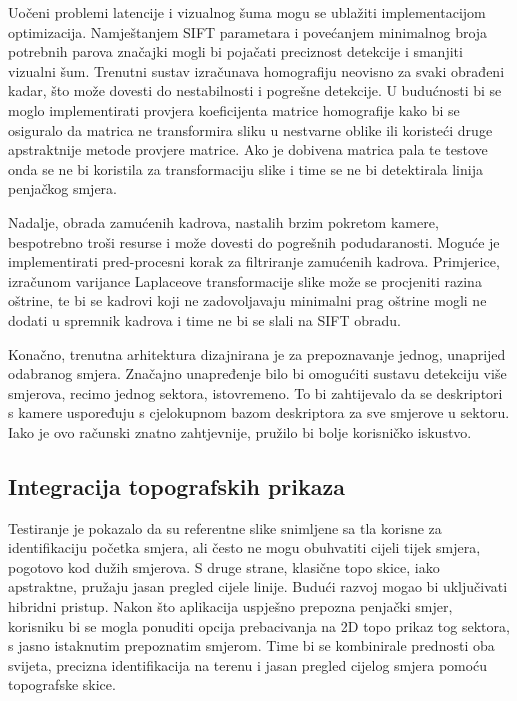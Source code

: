 Uočeni problemi latencije i vizualnog šuma mogu se ublažiti implementacijom optimizacija. Namještanjem SIFT parametara i povećanjem minimalnog broja potrebnih parova značajki mogli bi pojačati preciznost detekcije i smanjiti vizualni šum. Trenutni sustav izračunava homografiju neovisno za svaki obrađeni kadar, što može dovesti do nestabilnosti i pogrešne detekcije. U budućnosti bi se moglo implementirati provjera koeficijenta matrice homografije kako bi se osiguralo da matrica ne transformira sliku u nestvarne oblike ili koristeći druge apstraktnije metode provjere matrice. Ako je dobivena matrica pala te testove onda se ne bi koristila za transformaciju slike i time se ne bi detektirala linija penjačkog smjera.

Nadalje, obrada zamućenih kadrova, nastalih brzim pokretom kamere, bespotrebno troši resurse i može dovesti do pogrešnih podudaranosti. Moguće je implementirati pred-procesni korak za filtriranje zamućenih kadrova. Primjerice, izračunom varijance Laplaceove transformacije slike može se procjeniti razina oštrine, te bi se kadrovi koji ne zadovoljavaju minimalni prag oštrine mogli ne dodati u spremnik kadrova i time ne bi se slali na SIFT obradu.

Konačno, trenutna arhitektura dizajnirana je za prepoznavanje jednog, unaprijed odabranog smjera. Značajno unapređenje bilo bi omogućiti sustavu detekciju više smjerova, recimo jednog sektora, istovremeno. To bi zahtijevalo da se deskriptori s kamere uspoređuju s cjelokupnom bazom deskriptora za sve smjerove u sektoru. Iako je ovo računski znatno zahtjevnije, pružilo bi bolje korisničko iskustvo.

\subsection{Integracija topografskih prikaza}


Testiranje je pokazalo da su referentne slike snimljene sa tla korisne za identifikaciju početka smjera, ali često ne mogu obuhvatiti cijeli tijek smjera, pogotovo kod dužih smjerova. S druge strane, klasične topo skice, iako apstraktne, pružaju jasan pregled cijele linije. Budući razvoj mogao bi uključivati hibridni pristup. Nakon što aplikacija uspješno prepozna penjački smjer, korisniku bi se mogla ponuditi opcija prebacivanja na 2D topo prikaz tog sektora, s jasno istaknutim prepoznatim smjerom. Time bi se kombinirale prednosti oba svijeta, precizna identifikacija na terenu i jasan pregled cijelog smjera pomoću topografske skice.
